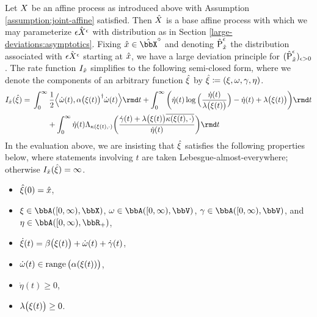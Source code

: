 \begin{theorem}
  \label{eq:ldp-closed-form}
  Let $X$ be an affine process as introduced above with Assumption \ref{assumption:joint-affine} satisfied.
  Then $\hat{X}$ is a base affine process with which we may parameterize $\hat{\epsilon X^\epsilon}$ with distribution as in Section \ref{large-deviations:asymptotics}.
  Fixing $\hat\stateVar \in \hat\stateSpace^\circ$ and denoting $\hat{{\operatorname{P}}}^\epsilon_{\hat{x}}$ the distribution associated with $\hat{\epsilon X^\epsilon}$ starting at $\hat{x}$, we have a large deviation principle for $(\hat{{\operatorname{P}}}^\epsilon_{\hat{x}})_{\epsilon>0}$.
  The rate function $I_{\hat{x}}$ simplifies to the following semi-closed form, where we denote the components of an arbitrary function $\hat{\xi}$ by $\hat{\xi} \coloneqq (\xi, \omega, \gamma, \eta)$.
  \begin{equation*}
    \rf_{\hat\stateVar}(\hat\pathVar) = 
    \begin{aligned}[t]
      &\int_0^\infty \frac12 \Bprj{\dot\omega(t)}{\affDiff\big(\pathVar(t)\big)^\dagger \dot\omega(t)} \rmd t 
      + \int_0^\infty \bigg( \dot\eta(t)\log\Big(\frac{\dot\eta(t)}{\affInt\big(\pathVar(t)\big)} \Big) - \dot\eta(t) + \affInt\big(\pathVar(t)\big) \bigg) \rmd t  \\
      &\qquad+ \int_0^\infty \dot\eta(t) \ode_{\affDist(\pathVar(t),\cdot)}\bigg( \frac{\dot\gamma(t) + \affInt\big(\pathVar(t)\big)\overline{\affDist(\pathVar(t), \cdot)}}{\dot\eta(t)} \bigg) \rmd t
    \end{aligned}
  \end{equation*}
  In the evaluation above, we are insisting that $\hat{\xi}$ satisfies the following properties below, where statements involving $t$ are taken Lebesgue-almost-everywhere; otherwise $I_{\hat{x}}(\hat{\xi}) = \infty$.
  \begin{itemize}
    \item
      $\hat{\xi}(0) = \hat{x}$,
    \item
      $\pathVar \in \acpathSpace{[0,\infty)}{\stateSpace}$, $\omega \in \acpathSpace{[0,\infty)}{\vecSpace}$, $\gamma \in \acpathSpace{[0,\infty)}{\vecSpace}$, and $\eta \in \acpathSpace{[0,\infty)}{\bbR_+}$,
    \item
      $\dot{\xi}(t) = \beta\big(\xi(t)\big) + \dot\omega(t) + \dot\gamma(t)$,
    \item
      $\dot\omega(t) \in \operatorname{range}\big(\alpha(\xi(t))\big)$,
    \item
      $\dot\eta(t) \geq 0$,
    \item
      $\lambda\big(\xi(t)\big) \geq 0$.
  \end{itemize}
\end{theorem}
